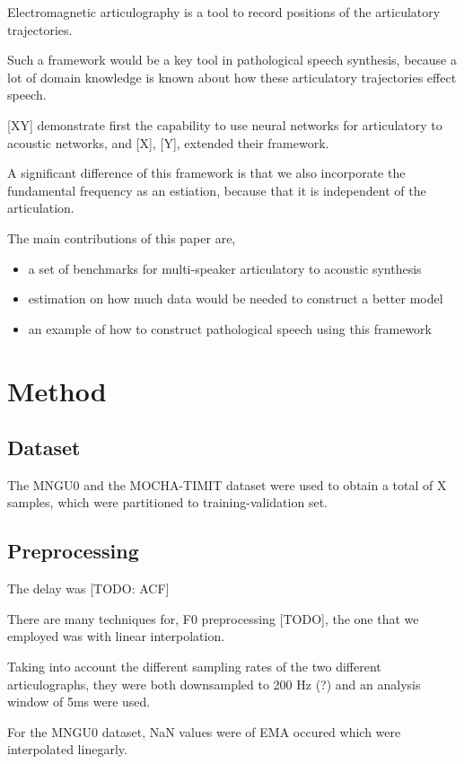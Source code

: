\documentclass[a4paper]{article}
\begin{document}
Electromagnetic articulography is a tool to record positions of the articulatory trajectories.


Such a framework would be a key tool in pathological speech synthesis,
because a lot of domain knowledge is known about how these articulatory
trajectories effect speech.

[XY] demonstrate first the capability to use neural networks for articulatory
to acoustic networks, and [X], [Y], extended their framework.

A significant difference of this framework is that we also incorporate
the fundamental frequency as an estiation, because that it is independent
of the articulation.



The main contributions of this paper are,
\begin{itemize}
\item a set of benchmarks for multi-speaker articulatory to acoustic synthesis
\item estimation on how much data would be needed to construct a better model
\item an example of how to construct pathological speech using this framework
\end{itemize}


\section{Method}

\subsection{Dataset}

The MNGU0 and the MOCHA-TIMIT dataset were used to obtain a total of
X samples, which were partitioned to training-validation set.

\subsection{Preprocessing}

The delay was [TODO: ACF]

There are many techniques for, F0 preprocessing [TODO], the one that
we employed was with linear interpolation.

Taking into account the different sampling rates of the two different
articulographs, they were both downsampled to 200 Hz (?) and an analysis
window of 5ms were used.

For the MNGU0 dataset, NaN values were of EMA occured which were interpolated linegarly.
\end{document}
